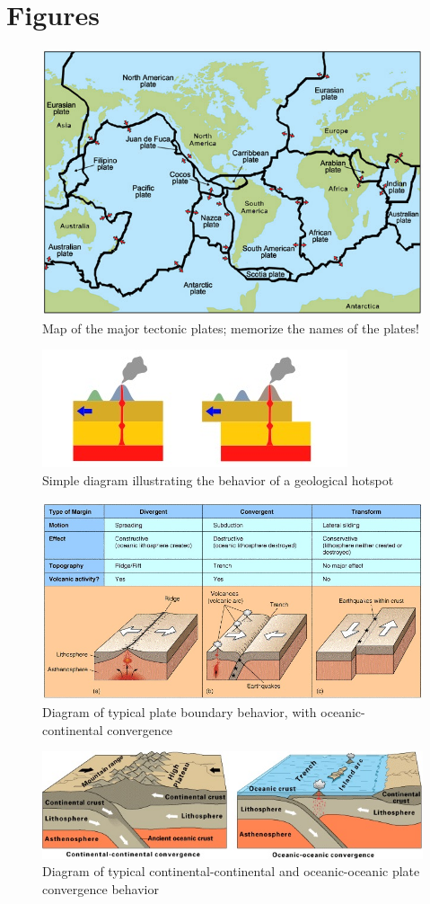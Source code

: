 \documentclass{article}
\begin{document}
\section{Figures}
\begin{figure}[H]
	\centering
	\includegraphics[width=\textwidth]{./Images/BC3_PlateMap.jpg}
	\caption{Map of the major tectonic plates; memorize the names of the plates!}
\end{figure}
\begin{figure}[H]
    \centering
    \includegraphics{./Images/BC3_Hotspot.jpg}
    \caption{Simple diagram illustrating the behavior of a geological hotspot}
\end{figure}
\begin{figure}[H]
    \centering
    \includegraphics[width=\textwidth]{./Images/BC3_PlateBoundary.jpg}
    \caption{Diagram of typical plate boundary behavior, with oceanic-continental convergence}
\end{figure}
\begin{figure}[H]
    \centering
    \includegraphics{./Images/BC3_PlateBoundaryC.jpg}
    \caption{Diagram of typical continental-continental and oceanic-oceanic plate convergence behavior}
\end{figure}
\end{document}
